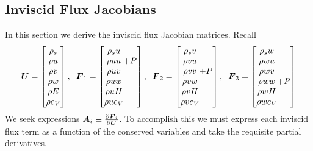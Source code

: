 \subsection{Inviscid Flux Jacobians}
In this section we derive the inviscid flux Jacobian matrices.  Recall
\begin{gather*}
    \bv{U} =
    \begin{bmatrix}
      \rho_s \\
      \rho u \\
      \rho v \\
      \rho w \\
      \rho E \\
      \rho  e_V 
    \end{bmatrix},\;\;
    \bv{F}_1 =
    \begin{bmatrix}
      \rho_s u&       \\
      \rho uu &\hspace{-1em}+ P \\
      \rho uv& \\
      \rho uw& \\
      \rho u H& \\
      \rho u e_V&
    \end{bmatrix},\;\;
    \bv{F}_2 =
    \begin{bmatrix}
      \rho_s v&       \\
      \rho vu& \\
      \rho vv &\hspace{-1em}+ P \\
      \rho vw& \\
      \rho v H& \\
      \rho v e_V&
    \end{bmatrix},\;\;
    \bv{F}_3 =
    \begin{bmatrix}
      \rho_s w&       \\
      \rho wu& \\
      \rho wv& \\
      \rho ww  &\hspace{-1em}+ P \\
      \rho w H& \\
      \rho w e_V&
    \end{bmatrix}
\end{gather*}
We seek expressions ${\boldsymbol{A}}_i \equiv {\frac{\partial{{\boldsymbol{F}}_i}}{\partial{{\boldsymbol{U}}}}}$.  To accomplish this we must express each inviscid flux term as a function of the conserved variables and take the requisite partial derivatives.

